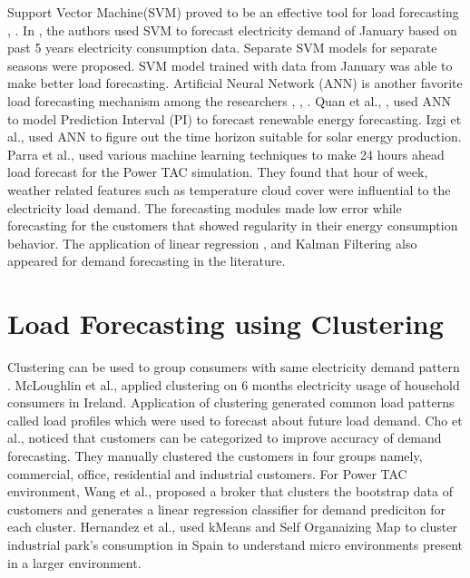 Support Vector Machine(SVM) proved to be an effective tool for load forecasting \cite{sapankevych2009time}, \cite{chen2004load}. In \cite{chen2004load}, the authors used SVM to forecast electricity demand of January based on past 5 years electricity consumption data. Separate SVM models for separate seasons were proposed. SVM model trained with data from January was able to make better load forecasting. Artificial Neural Network (ANN) is another favorite load forecasting mechanism among the researchers \cite{izgi2012short}, \cite{quan2014short}, \cite{hsu2003regional}. Quan et al., \cite{quan2014short}, used ANN to model Prediction Interval (PI) to forecast renewable energy forecasting. Izgi et al.,  \cite{izgi2012short} used ANN to figure out the time horizon suitable for solar energy production. Parra \cite{parra2013initial} et al., used various machine learning techniques to make 24 hours ahead load forecast for the Power TAC simulation. They found that hour of week, weather related features such as temperature cloud cover were influential to the electricity load demand. The forecasting modules made low error while forecasting for the customers that showed regularity in their energy consumption behavior. The application of linear regression \cite{mcloughlin2015clustering}, \cite{hernandez2012classification} and Kalman Filtering \cite{al2004short} also appeared for demand forecasting in the literature. 

\section {Load Forecasting using Clustering}

Clustering can be used to group consumers with same electricity demand pattern \cite{hernandez2012classification}. McLoughlin \cite{mcloughlin2015clustering} et al., applied clustering on 6 months electricity usage of household consumers in Ireland. Application of clustering generated common load patterns called load profiles which were used to forecast about future load demand. Cho \cite{cho1995customer} et al., noticed that customers can be categorized to improve accuracy of demand forecasting. They manually clustered the customers in four groups namely, commercial, office, residential and industrial customers. For Power TAC environment, Wang \cite{wang2015gongbroker} et al., proposed a broker that clusters the bootstrap data of customers and generates a linear regression classifier for demand prediciton for each cluster.  Hernandez\cite{hernandez2012classification} et al., used kMeans and Self Organaizing Map to cluster industrial park's consumption in Spain to understand micro environments present in a larger environment.


